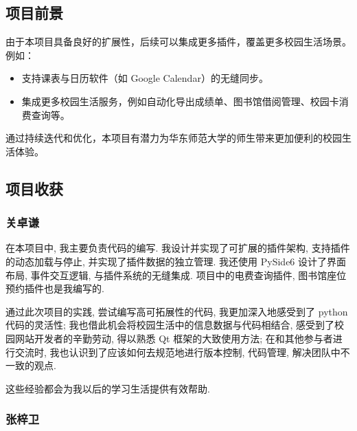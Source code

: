\documentclass[14pt,a4paper,UTF8,twoside]{article}
\begin{document}
\subsection{项目前景}

由于本项目具备良好的扩展性，后续可以集成更多插件，覆盖更多校园生活场景。例如：

\begin{itemize}
    \item 支持课表与日历软件（如 Google Calendar）的无缝同步。
    \item 集成更多校园生活服务，例如自动化导出成绩单、图书馆借阅管理、校园卡消费查询等。
\end{itemize}

通过持续迭代和优化，本项目有潜力为华东师范大学的师生带来更加便利的校园生活体验。

\newpage{}

\subsection{项目收获}

\subsubsection*{关卓谦}

\begin{Thought}
在本项目中, 我主要负责代码的编写.
我设计并实现了可扩展的插件架构, 支持插件的动态加载与停止, 并实现了插件数据的独立管理.
我还使用 PySide6 设计了界面布局, 事件交互逻辑, 与插件系统的无缝集成.
项目中的电费查询插件, 图书馆座位预约插件也是我编写的.

\vspace{0.3cm}

通过此次项目的实践, 尝试编写高可拓展性的代码, 我更加深入地感受到了 python 代码的灵活性;
我也借此机会将校园生活中的信息数据与代码相结合, 感受到了校园网站开发者的辛勤劳动, 得以熟悉 Qt 框架的大致使用方法;
在和其他参与者进行交流时, 我也认识到了应该如何去规范地进行版本控制, 代码管理, 解决团队中不一致的观点.

\vspace{0.3cm}

这些经验都会为我以后的学习生活提供有效帮助.
\end{Thought}

\subsubsection*{张梓卫}
\end{document}
